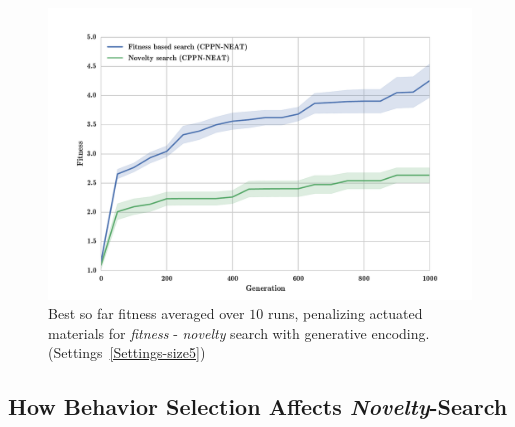 \begin{figure}[t!]
\centering
\includegraphics[width=1.0\textwidth]{../Figures/Results/FitNovSize5Pen2.pdf}
\caption[]{Best so far fitness averaged over $10$ runs, penalizing actuated materials for \emph{fitness} - \emph{novelty} search with generative encoding. (Settings~\ref{Settings-size5})}
\label{fig:FitNovSize5Pen2}
\end{figure}

\subsection{How Behavior Selection Affects \emph{Novelty}-Search}

